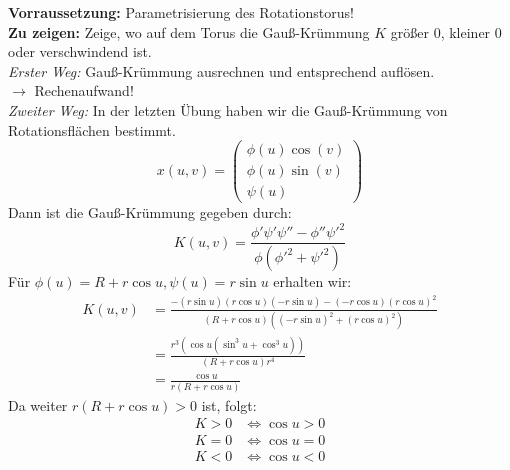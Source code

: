 \begin{problem}[1]
  \textbf{Vorraussetzung:} Parametrisierung des Rotationstorus! \\
  \textbf{Zu zeigen:} Zeige, wo auf dem Torus die Gauß-Krümmung \( K \) größer 0, kleiner 0 oder verschwindend ist. \\
  \emph{Erster Weg:} Gauß-Krümmung ausrechnen und entsprechend auflösen. \\
  \( \rightarrow \) Rechenaufwand! \\
  \emph{Zweiter Weg:} In der letzten Übung haben wir die Gauß-Krümmung von Rotationsflächen bestimmt.
  \begin{equation*}
    x(u,v) = \begin{pmatrix}
      \phi(u) \cos(v) \\
      \phi(u) \sin(v) \\
      \psi(u) 
    \end{pmatrix}
  \end{equation*}
  Dann ist die Gauß-Krümmung gegeben durch: 
  \begin{equation*} 
    K(u,v) = \frac{\phi' \psi' \psi'' - \phi'' \psi'^2}{\phi(\phi'^2 + \psi'^2)}
  \end{equation*}
  Für \( \phi(u) = R + r \cos u, \psi(u) = r \sin u \) erhalten wir:
  \begin{align*}
    K(u,v) &= \frac{-(r \sin u)(r \cos u)(-r \sin u)-(-r \cos u){(r \cos u)}^2}{(R+r \cos u)({(-r \sin u)}^2 + {(r \cos u)}^2)} \\
    &= \frac{r^3(\cos u(\sin^3u + \cos^3 u))}{ (R + r \cos u) r^4} \\
    &= \frac{\cos u}{r(R+r \cos u)} 
  \end{align*}
  Da weiter \( r(R + r \cos u) > 0 \) ist, folgt: 
  \begin{align*}
    K > 0 &\Leftrightarrow \cos u > 0 \\
    K = 0 &\Leftrightarrow \cos u = 0 \\
    K < 0 &\Leftrightarrow \cos u < 0
  \end{align*}
  
  
\end{problem}
